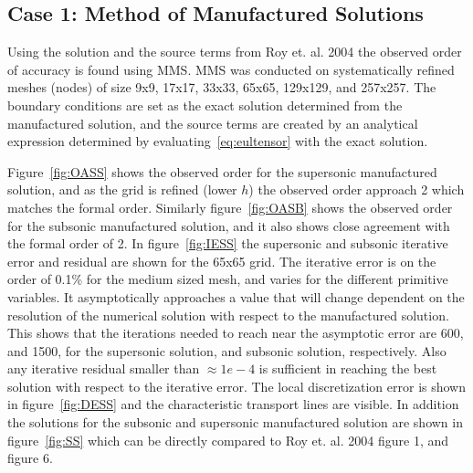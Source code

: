 \documentclass[]{aiaa-tc}%
\begin{document}
\subsection{Case 1: Method of Manufactured Solutions}
Using the solution and the source terms from Roy et. al. 2004 the observed order of accuracy is found using MMS.\cite{Roy2004} MMS was conducted on systematically refined meshes (nodes) of size 9x9, 17x17, 33x33, 65x65, 129x129, and 257x257. The boundary conditions are set as the exact solution determined from the manufactured solution, and the source terms are created by an analytical expression determined by evaluating~\ref{eq:eultensor} with the exact solution. 

Figure~\ref{fig:OASS} shows the observed order for the supersonic manufactured solution, and as the grid is refined (lower $h$) the observed order approach 2 which matches the formal order. Similarly figure~\ref{fig:OASB} shows the observed order for the subsonic manufactured solution, and it also shows close agreement with the formal order of 2. In figure~\ref{fig:IESS} the supersonic and subsonic iterative error and residual are shown for the 65x65 grid. The iterative error is on the order of 0.1\% for the medium sized mesh, and varies for the different primitive variables. It asymptotically approaches a value that will change dependent on the resolution of the numerical solution with respect to the manufactured solution. This shows that the iterations needed to reach near the asymptotic error are 600, and 1500, for the supersonic solution, and subsonic solution, respectively. Also any iterative residual smaller than $\approx1e-4$ is sufficient in reaching the best solution with respect to the iterative error. The local discretization error is shown in figure~\ref{fig:DESS} and the characteristic transport lines are visible. In addition the solutions for the subsonic and supersonic manufactured solution are shown in figure~\ref{fig:SS} which can be directly compared to Roy et. al. 2004 figure 1, and figure 6.\cite{Roy2004}
\end{document}
